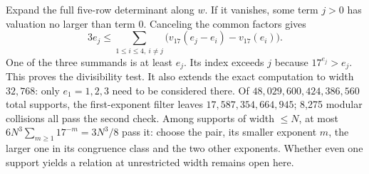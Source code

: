 Expand the full five-row determinant along $w$. If it vanishes, some term $j>0$ has valuation no larger than term 0. Canceling the common factors gives
\[
  3e_j\le\sum_{1\le i\le4,\ i\ne j}
       \big(v_{17}(e_j-e_i)-v_{17}(e_i)\big).
\]
One of the three summands is at least $e_j$. Its index exceeds $j$ because $17^{e_j}>e_j$. This proves the divisibility test. It also extends the exact computation to width $32{,}768$: only $e_1=1,2,3$ need to be considered there. Of $48{,}029{,}600{,}424{,}386{,}560$ total supports, the first-exponent filter leaves $17{,}587{,}354{,}664{,}945$; 8,275 modular collisions all pass the second check. Among supports of width $\le N$, at most $6N^3\sum_{m\ge1}17^{-m}=3N^3/8$ pass it: choose the pair, its smaller exponent $m$, the larger one in its congruence class and the two other exponents. Whether even one support yields a relation at unrestricted width remains open here.
